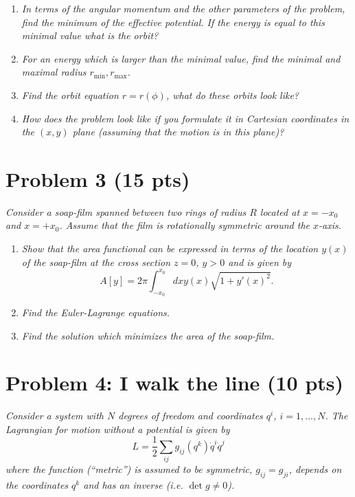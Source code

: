 \documentclass[12pt]{article} %
\begin{document}
\begin{enumerate}[label=\textbf{(\alph*)}]

\item \textit{
In terms of the angular momentum and the other parameters of the problem, find the minimum of the effective potential. If the energy is equal to this minimal value what is the orbit?
}


\item \textit{
For an energy which is larger than the minimal value, find the minimal and maximal radius $r_\text{min}, r_\text{max}$. 
}


\item \textit{
Find the orbit equation $r = r(\phi)$, what do these orbits look like?
}


\item \textit{
How does the problem look like if you formulate it in Cartesian coordinates in the $(x,y)$ plane (assuming that the motion is in this plane)?
}


\end{enumerate}


\section*{Problem 3 (15 pts)}
\textit{
Consider a soap-film spanned between two rings of radius $R$ located at $x = -x_0$ and $x = +x_0$. Assume that the film is rotationally symmetric around the $x$-axis. 
}

\begin{enumerate}[label=\textbf{(\alph*)}]

\item \textit{
Show that the area functional can be expressed in terms of the location $y(x)$ of the soap-film at the cross section $z=0$, $y>0$ and is given by
\begin{equation}
A[y] = 2\pi \int_{-x_0}^{x_0} dx y(x) \sqrt{1+y'(x)^2}.
\end{equation}
}


\item \textit{
Find the Euler-Lagrange equations.
}


\item \textit{
Find the solution which minimizes the area of the soap-film.
}


\end{enumerate}



\section*{Problem 4: I walk the line (10 pts)}
\textit{
Consider a system with $N$ degrees of freedom and coordinates $q^i$, $i = 1, \dots, N$. The Lagrangian for motion without a potential is given by
\begin{equation}
L = \frac{1}{2} \sum_{ij} g_{ij} (q^k) \dot{q}^i \dot{q}^j
\end{equation}
where the function (``metric'') is assumed to be symmetric, $g_{ij} = g_{ji}$, depends on the coordinates $q^k$ and has an inverse (i.e. $\det g \neq 0$). 
}
\end{document}
